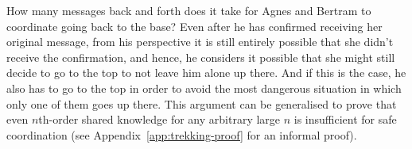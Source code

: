 How many messages back and forth does it take for Agnes and Bertram to coordinate going back to the base? Even after he has confirmed receiving her original message, 
from his perspective it is still entirely possible that she didn't receive the confirmation, and hence, he considers it possible that she might still decide to go to the top to not leave him alone up there. And if this is the case, he also has to go to the top in order to avoid the most dangerous situation in which only one of them goes up there. This argument can be generalised to prove that even $n$th-order shared knowledge for any arbitrary large $n$ is insufficient for safe coordination (see Appendix~\ref{app:trekking-proof} for an informal proof).
